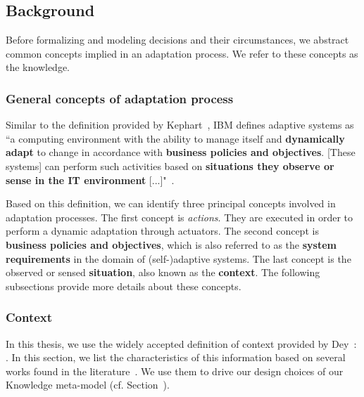 \subsection{Background}
Before formalizing and modeling decisions and their circumstances, we abstract common concepts implied in an adaptation process. We refer to these concepts as the knowledge.

\subsubsection{General concepts of adaptation process}

Similar to the definition provided by Kephart~\cite{DBLP:journals/computer/KephartC03}, IBM  defines adaptive systems as ``a computing environment with the ability to manage itself and \textbf{dynamically adapt} to change in accordance with \textbf{business policies and objectives}. [These systems] can perform such activities based on \textbf{situations they observe or sense in the IT environment} [...]"~\cite{computing2006architectural}.

Based on this definition, we can identify three principal concepts involved in adaptation processes.
The first concept is  \textit{actions}. They are executed in order to perform a dynamic adaptation through actuators.
The second concept is \textbf{business policies and objectives}, which is also referred to as the \textbf{system requirements} in the domain of (self-)adaptive systems.
The last concept is the observed or sensed \textbf{situation}, also known as the \textbf{context}.
The following subsections provide more details about these concepts.

\subsubsection{Context}

In this thesis, we use the widely accepted definition of context provided by Dey~\cite{DBLP:journals/puc/Dey01}: .
In this section, we list the characteristics of this information based on several works found in the literature~\cite{DBLP:conf/pervasive/HenricksenIR02, chong2007context, DBLP:conf/seke/0001FNMKT14, bettini2010survey, DBLP:journals/comsur/PereraZCG14}.
We use them to drive our design choices of our Knowledge meta-model (cf. Section~).

